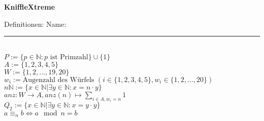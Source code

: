 \documentclass[a4paper,11pt]{exam}
\begin{document}
\begin{center}
    \Large\bf{KniffleXtreme}
\end{center}
Definitionen: \hspace{200pt} Name: \rule{4cm}{0.15mm} \\
$P := \{ p \in \mathbb{N}: p \text{ ist Primzahl} \} \cup \{ 1 \}$ \\
$A := \{ 1, 2, 3, 4, 5 \}$ \\
$W := \{ 1, 2, ..., 19, 20 \}$ \\
$w_i := \text{Augenzahl des Würfels } (i \in \{1, 2, 3, 4, 5\}, w_i \in \{1, 2, ..., 20\})$ \\
$n\mathbb{N} := \{ x \in \mathbb{N} | \exists y \in \mathbb{N}: x = n\cdot y \}$ \\
$anz: W \rightarrow A, anz(n) \mapsto \displaystyle\sum_{i \in A, w_i = n} 1$ \\
$Q_2 := \{ x \in \mathbb{N} | \exists y \in \mathbb{N}: x = y \cdot y \} $\\
$ a \equiv_n  b \Leftrightarrow a \mod{n} = b$
\newline\newline\newline
\end{document}
